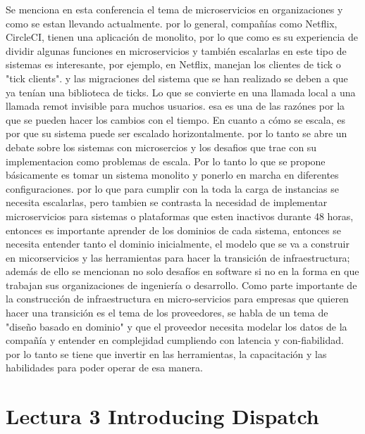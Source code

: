 \documentclass{article}
\begin{document}
Se menciona en esta conferencia el tema de microservicios en organizaciones y como se estan llevando actualmente. por lo general, compañías como Netflix, CircleCI, tienen una aplicación de monolito, por lo que como es su experiencia de dividir algunas funciones en microservicios y también escalarlas en este tipo de sistemas es interesante, por ejemplo, en Netflix,  manejan los clientes de tick o "tick clients". y las migraciones del sistema  que se han realizado se deben a que ya tenían una biblioteca de ticks. Lo que se convierte en una llamada local a una llamada remot invisible para muchos usuarios. esa es una de las razónes por la que se pueden hacer los cambios con el tiempo. En cuanto a cómo se escala, es por que su sistema puede ser escalado horizontalmente.
por lo tanto se abre un debate sobre los sistemas con microsercios y los desafios que trae con su implementacion como problemas de escala. Por lo tanto lo que se propone básicamente es tomar un sistema monolito y ponerlo en marcha en diferentes configuraciones. por lo que para cumplir con la toda la carga de instancias se necesita escalarlas, pero tambien se contrasta la necesidad de implementar microservicios para sistemas o plataformas  que esten inactivos durante 48 horas, entonces es importante aprender de los dominios de cada sistema, entonces se necesita entender tanto el dominio inicialmente, el modelo que se va a construir en micorservicios y las herramientas para hacer la transición de infraestructura; además de ello se mencionan no solo desafíos en software si no en  la forma en que trabajan sus organizaciones de ingeniería o desarrollo. Como parte importante de la construcción de infraestructura en micro-servicios para empresas que quieren hacer una transición es el tema de los proveedores, se habla de un tema de  "diseño basado en dominio" y que el proveedor necesita modelar los datos de la compañía y entender en complejidad cumpliendo con latencia y con-fiabilidad. por lo tanto  se tiene que invertir en las herramientas, la capacitación y las habilidades para poder operar de esa manera. 














\section{Lectura 3 Introducing Dispatch}
\end{document}
